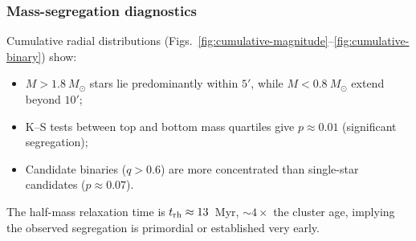 \documentclass[../main.tex]{subfiles}
\begin{document}
\subsubsection{Mass-segregation diagnostics}
Cumulative radial distributions (Figs.~\ref{fig:cumulative-magnitude}--\ref{fig:cumulative-binary}) show:
\begin{itemize}
  \item $M>1.8~M_\odot$ stars lie predominantly within $5'$, while $M<0.8~M_\odot$ extend beyond $10'$;
  \item K--S tests between top and bottom mass quartiles give $p\approx0.01$ (significant segregation);
  \item Candidate binaries ($q>0.6$) are more concentrated than single-star candidates ($p\approx0.07$).
\end{itemize}
The half-mass relaxation time is $t_{\rm rh}\approx13$~Myr, $\sim4\times$ the cluster age, implying the observed segregation is primordial or established very early.

\biblio
\end{document}
